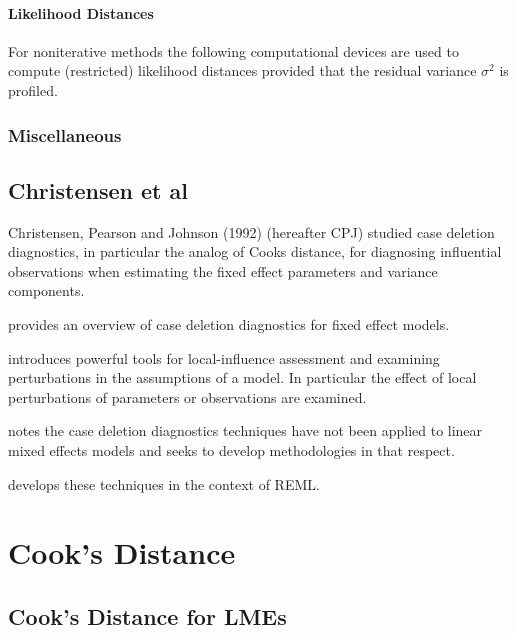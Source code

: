 \documentclass[12pt, a4paper]{report}
\theoremstyle{plain}
\theoremstyle{definition}
\theoremstyle{remark}
\begin{document}
\subsubsection{Likelihood Distances}
For noniterative methods the following computational devices are used to compute (restricted) likelihood distances provided that the residual variance
$\sigma^2$ is profiled.
\subsection{Miscellaneous}



\newpage


\section{Christensen et al}         %
Christensen, Pearson and Johnson (1992) (hereafter CPJ) studied case deletion diagnostics, in particular the analog of Cooks
distance, for diagnosing influential observations when estimating
the fixed effect parameters and variance
components.



\citet{CPJ92} provides an overview of case deletion
diagnostics for fixed effect models.

\citet{cook86} introduces powerful tools for local-influence
assessment and examining perturbations in the assumptions of a
model. In particular the effect of local perturbations of
parameters or observations are examined.

\citet{Christiansen} notes the case deletion diagnostics
techniques have not been applied to linear mixed effects models
and seeks to develop methodologies in that respect.

\citet{Christiansen} develops these techniques in the context of
REML.



\chapter{Cook's Distance}

\section{Cook's Distance for LMEs} %
\end{document}
